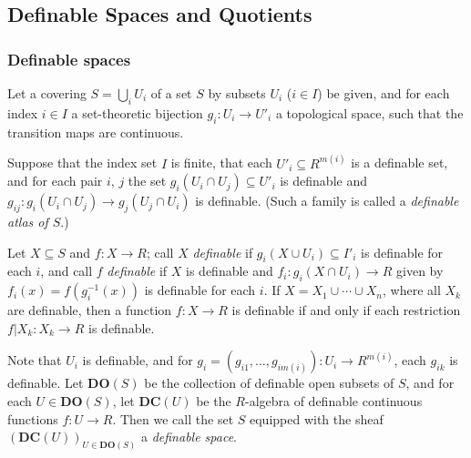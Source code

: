 \documentclass{amsart}
\newtheorem{theorem}{Theorem}[subsection]
\theoremstyle{definition}
\numberwithin{equation}{section}
\begin{document}



\subsection{Definable Spaces and Quotients}
\subsubsection{Definable spaces}
Let a covering $S = \bigcup_i U_i$ of a set $S$ by subsets $U_i$ ($i\in I$) be given,
and for each index $i \in I$ a set-theoretic bijection $g_i: U_i \to U'_i$ a topological space,
such that the transition maps are continuous.

Suppose that the index set $I$ is finite,
that each $U'_i \subseteq R^{m(i)}$ is a definable set,
and for each pair $i$, $j$ the set $g_i(U_i\cap U_j) \subseteq U'_i$
is definable and $g_{ij}: g_i(U_i\cap U_j) \to g_j(U_j\cap U_i)$ is definable.
(Such a family is called a \emph{definable atlas of $S$}.)

Let $X \subseteq S$ and $f : X \to R$;
call $X$ \emph{definable} if $g_i(X\cup U_i) \subseteq I'_i$ is definable for each $i$,
and call $f$ \emph{definable} if $X$ is definable and 
$f_i : g_i(X \cap U_i) \to R$ given by $f_i(x) = f(g_i^{-1}(x))$ is definable for each $i$.
If $X = X_1\cup \cdots \cup X_n$,
where all $X_k$ are definable,
then a function $f: X \to R$ is definable if and only if each restriction $f|X_k: X_k \to R$ is definable.

Note that $U_i$ is definable,
and for $g_i = (g_{i1},\dots,g_{im(i)}) : U_i \to R^{m(i)}$,
each $g_{ik}$ is definable.
Let $\mathbf{DO}(S)$ be the collection of definable open subsets of $S$,
and for each $U \in \mathbf{DO}(S)$,
let $\mathbf{DC}(U)$ be the $R$-algebra of definable continuous functions $f: U \to R$.
Then we call the set $S$ equipped with the sheaf $(\mathbf{DC}(U))_{U \in \mathbf{DO}(S)}$ a \emph{definable space}.
\end{document}
